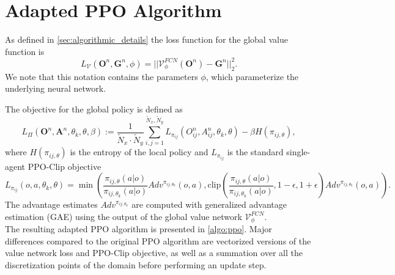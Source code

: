 \section{Adapted PPO Algorithm} \label{appendix:ppo}
As defined in \cref{sec:algorithmic_details} the loss function for the global value function is 
\[ L_{\mathcal{V}}(\boldsymbol O^n, \boldsymbol{G}^n, \phi) =  ||\mathcal V^{FCN}_{\phi}(\boldsymbol O^n)- \boldsymbol{G}^n||_2^2. \]
We note that this notation contains the parameters $\phi$, which parameterize the underlying neural network.

The objective for the global policy is defined as
\[L_{\Pi}(\boldsymbol O^n, \boldsymbol A^n, \theta_k, \theta, \beta) := \frac{1}{\tilde N_x\cdot \tilde N_y} \sum_{i,j=1}^{\tilde N_x, \tilde N_y} L_{\pi_{ij}}({O}^n_{ij}, {A}^n_{ij}, \theta_k, \theta) - \beta H(\pi_{ij,\theta}),\]
where  $H(\pi_{ij,\theta})$ is the entropy of the local policy and $L_{\pi_{ij}}$ is the standard single-agent PPO-Clip objective
\[ \label{eq:ppo_objective}
L_{\pi_{ij}}(o, a, \theta_k, \theta) = \min \left( \frac{\pi_{ij,\theta}(a|o)}{\pi_{ij,\theta_k}(a|o)} Adv^{\pi_{ij,\theta_k}}(o, a), \text{clip} \left( \frac{\pi_{ij,\theta}(a|o)}{\pi_{ij,\theta_k}(a|o)}, 1 - \epsilon, 1 + \epsilon \right) Adv^{\pi_{ij,\theta_k}}(o, a) \right).
\]
The advantage estimates \( {Adv}^{\pi_{ij,\theta_k}} \) are computed with generalized advantage estimation (GAE) \cite{generalized_advantage_estimation} using the output of the global value network \( \mathcal{V}^{FCN}_{\phi} \).\\

The resulting adapted PPO algorithm is presented in \cref{algo:ppo}. Major differences compared to the original PPO algorithm are vectorized versions of the value network loss and PPO-Clip objective, as well as a summation over all the discretization points of the domain before performing an update step.  

